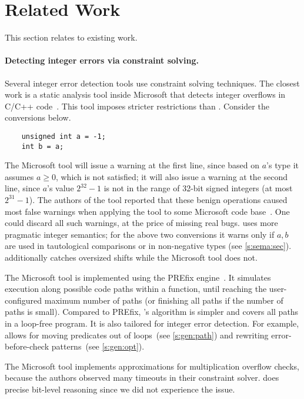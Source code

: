 \section{Related Work}
\label{s:relwk}

This section relates \sys to existing work.

\paragraph{Detecting integer errors via constraint solving.}

Several integer error detection tools use constraint solving
techniques.  The closest work is a static analysis tool inside
Microsoft that detects integer overflows in C/C++ code~\cite{moy:z3prefix}.
This tool imposes stricter restrictions than \sys.
Consider the conversions below.
\begin{Verbatim}
	unsigned int a = -1;
	int b = a;
\end{Verbatim}
The Microsoft tool will issue a warning at the first line,
since based on $a$'s type it assumes $a \geq 0$, which is not satisfied;
it will also issue a warning at the second line,
since $a$'s value $2^{32} - 1$ is not in the range of 32-bit signed integers
(at most $2^{31} - 1$).
The authors of the tool reported that these benign operations caused
most false warnings when applying the tool to some Microsoft code
base~\cite[\subsectionautorefname~6.2]{moy:z3prefix}.
One could discard all such warnings, at the price of
missing real bugs.
\sys uses more pragmatic integer semantics;
for the above two conversions it warns only if $a, b$ are used in
tautological comparisons or in non-negative types (see \autoref{s:sema:sec}).
\sys additionally catches oversized shifts while the Microsoft tool does not.

The Microsoft tool is implemented using the PREfix
engine~\cite{bush:prefix}.  It simulates execution along possible
code paths within a function, until reaching
the user-configured maximum number of paths (or finishing all paths
if the number of paths is small).
%
Compared to PREfix, \sys's algorithm is simpler
and covers all paths in a loop-free program.
It is also tailored for integer error detection.  For example, \sys
allows for moving predicates out of loops~(see \autoref{s:gen:path})
and rewriting error-before-check patterns~(see \autoref{s:gen:opt}).

The Microsoft tool implements approximations for multiplication
overflow checks, because the authors observed many timeouts in their
constraint solver.  \sys does precise bit-level reasoning
since we did not experience the issue.

